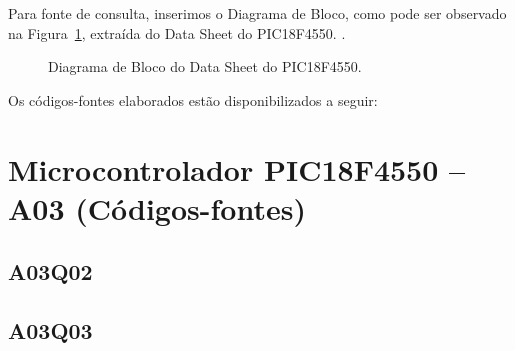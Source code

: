 \documentclass[
	12pt,				%
	openright,			%
  oneside,     %
	a4paper,			%
	english,			%
	french,				%
	spanish,			%
	brazil				%
	]{abntex2}
\begin{document}
Para fonte de consulta, inserimos o Diagrama de Bloco, como pode ser observado na Figura~\ref{fig:cha-3-diagrama-de-bloco-PIC18F4550}, extraída do Data Sheet do PIC18F4550. \cite{Inc.2009}.

\newpage

\begin{figure}[H]
  \centering
  \caption{\label{fig:cha-3-diagrama-de-bloco-PIC18F4550}Diagrama de Bloco do Data Sheet do PIC18F4550.}  
  
\end{figure}

\newpage

Os códigos-fontes elaborados estão disponibilizados a seguir:

\section*{Microcontrolador PIC18F4550 -- A03 (Códigos-fontes)}
\label{sec:PIC-A03Q02}
\subsection*{A03Q02}

\subsection*{A03Q03}




%
%
\end{document}

